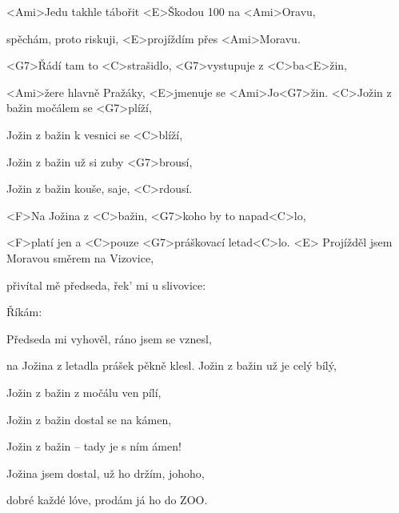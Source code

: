 
\zs
<Ami>Jedu takhle tábořit <E>Škodou 100 na <Ami>Oravu,

spěchám, proto riskuji, <E>projíždím přes <Ami>Moravu.

<G7>Řádí tam to <C>strašidlo, <G7>vystupuje z <C>ba<E>žin,

<Ami>žere hlavně Pražáky, <E>jmenuje se <Ami>Jo<G7>žin.
\ks
\zr
<C>Jožin z bažin močálem se <G7>plíží,

Jožin z bažin k vesnici se <C>blíží,

Jožin z bažin už si zuby <G7>brousí,

Jožin z bažin kouše, saje, <C>rdousí.

<F>Na Jožina z <C>bažin, <G7>koho by to napad<C>lo,

<F>platí jen a <C>pouze <G7>práškovací letad<C>lo. <E>
\kr
\zs
Projížděl jsem Moravou směrem na Vizovice,

přivítal mě předseda, řek' mi u slivovice:

\ks
\zr \kr
\zs
Říkám: 

Předseda mi vyhověl, ráno jsem se vznesl,

na Jožina z letadla prášek pěkně klesl.
\ks
\zr
Jožin z bažin už je celý bílý,

Jožin z bažin z močálu ven pílí,

Jožin z bažin dostal se na kámen,

Jožin z bažin -- tady je s ním ámen!

Jožina jsem dostal, už ho držím, johoho,

dobré každé lóve, prodám já ho do ZOO.
\kr
\kp
